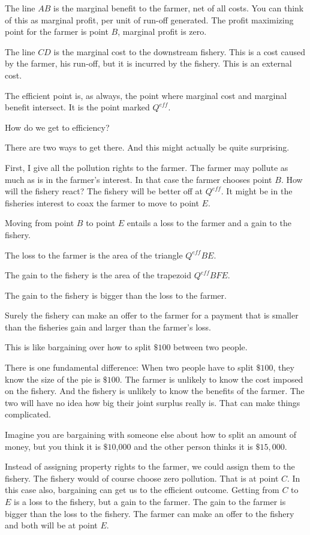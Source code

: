 \documentclass[
]{book}
\begin{document}
The line \(AB\) is the marginal benefit to the farmer, net of all costs. You can think of this as marginal profit, per unit of run-off generated. The profit maximizing point for the farmer is point \(B\), marginal profit is zero.

The line \(CD\) is the marginal cost to the downstream fishery. This is a cost caused by the farmer, his run-off, but it is incurred by the fishery. This is an external cost.

The efficient point is, as always, the point where marginal cost and marginal benefit intersect. It is the point marked \(Q^{eff}\).

How do we get to efficiency?

There are two ways to get there. And this might actually be quite surprising.

First, I give all the pollution rights to the farmer. The farmer may pollute as much as is in the farmer's interest. In that case the farmer chooses point \(B\). How will the fishery react? The fishery will be better off at \(Q^{eff}\). It might be in the fisheries interest to coax the farmer to move to point \(E\).

Moving from point \(B\) to point \(E\) entails a loss to the farmer and a gain to the fishery.

The loss to the farmer is the area of the triangle \(Q^{eff}BE\).

The gain to the fishery is the area of the trapezoid \(Q^{eff}BFE\).

The gain to the fishery is bigger than the loss to the farmer.

Surely the fishery can make an offer to the farmer for a payment that is smaller than the fisheries gain and larger than the farmer's loss.

This is like bargaining over how to split \(\$100\) between two people.

There is one fundamental difference: When two people have to split \(\$100\), they know the size of the pie is \(\$100\). The farmer is unlikely to know the cost imposed on the fishery. And the fishery is unlikely to know the benefits of the farmer. The two will have no idea how big their joint surplus really is. That can make things complicated.

Imagine you are bargaining with someone else about how to split an amount of money, but you think it is \(\$10\),000 and the other person thinks it is \(\$15,000\).

Instead of assigning property rights to the farmer, we could assign them to the fishery. The fishery would of course choose zero pollution. That is at point \(C\). In this case also, bargaining can get us to the efficient outcome. Getting from \(C\) to \(E\) is a loss to the fishery, but a gain to the farmer. The gain to the farmer is bigger than the loss to the fishery. The farmer can make an offer to the fishery and both will be at point \(E\).
\end{document}
